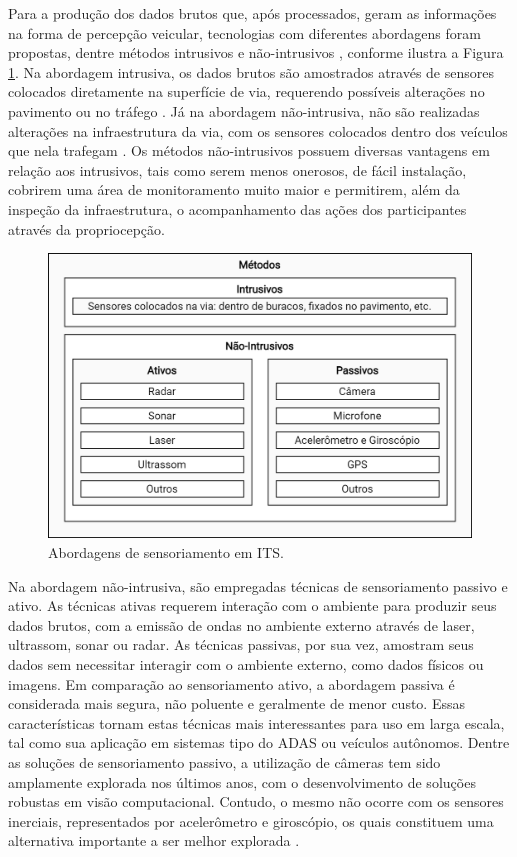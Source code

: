 Para a produção dos dados brutos que, após processados, geram as informações na forma de percepção veicular, tecnologias com diferentes abordagens foram propostas, dentre métodos intrusivos e não-intrusivos \cite{NI2016}, conforme ilustra a Figura \ref{fig:classificacao_sensores}. Na abordagem intrusiva, os dados brutos são amostrados através de sensores colocados diretamente na superfície de via, requerendo possíveis alterações no pavimento ou no tráfego \cite{mathew2014a}. Já na abordagem não-intrusiva, não são realizadas alterações na infraestrutura da via, com os sensores colocados dentro dos veículos que nela trafegam \cite{mathew2014b}. Os métodos não-intrusivos possuem diversas vantagens em relação aos intrusivos, tais como serem menos onerosos, de fácil instalação, cobrirem uma área de monitoramento muito maior e permitirem, além da inspeção da infraestrutura, o acompanhamento das ações dos participantes através da propriocepção.

\begin{figure}[h]
  \centering
  \caption{Abordagens de sensoriamento em ITS.}
  \label{fig:classificacao_sensores}
  \includegraphics[width=0.9\linewidth]{figuras/fig_1.png}
\end{figure}

Na abordagem não-intrusiva, são empregadas técnicas de sensoriamento passivo e ativo. As técnicas ativas requerem interação com o ambiente para produzir seus dados brutos, com a emissão de ondas no ambiente externo através de laser, ultrassom, sonar ou radar. As técnicas passivas, por sua vez, amostram seus dados sem necessitar interagir com o ambiente externo, como dados físicos ou imagens. Em comparação ao sensoriamento ativo, a abordagem passiva é considerada mais segura, não poluente e geralmente de menor custo. Essas características tornam estas técnicas mais interessantes para uso em larga escala, tal como sua aplicação em sistemas tipo do ADAS ou veículos autônomos. Dentre as soluções de sensoriamento passivo, a utilização de câmeras tem sido amplamente explorada nos últimos anos, com o desenvolvimento de soluções robustas em visão computacional. Contudo, o mesmo não ocorre com os sensores inerciais, representados por acelerômetro e giroscópio, os quais constituem uma alternativa importante a ser melhor explorada \cite{menegazzo2018,menegazzo2020}.

